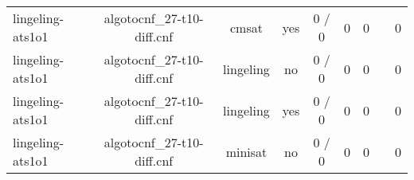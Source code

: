 \begin{appendices}
\begin{table}[p]
\begin{center}
\begin{tabular}{l|cccccccc}
  lingeling-ats1o1               & algotocnf\_27-t10-diff.cnf     & cmsat      & yes   & 0 / 0      & 0         & 0         &            & 0 \\ %
  lingeling-ats1o1               & algotocnf\_27-t10-diff.cnf     & lingeling  & no    & 0 / 0      & 0         & 0         &            & 0 \\ %
  lingeling-ats1o1               & algotocnf\_27-t10-diff.cnf     & lingeling  & yes   & 0 / 0      & 0         & 0         &            & 0 \\ %
  lingeling-ats1o1               & algotocnf\_27-t10-diff.cnf     & minisat    & no    & 0 / 0      & 0         & 0         &            & 0 \\ %
    \end{tabular}
  \end{center}
\end{table}

\newpage


\end{appendices}
